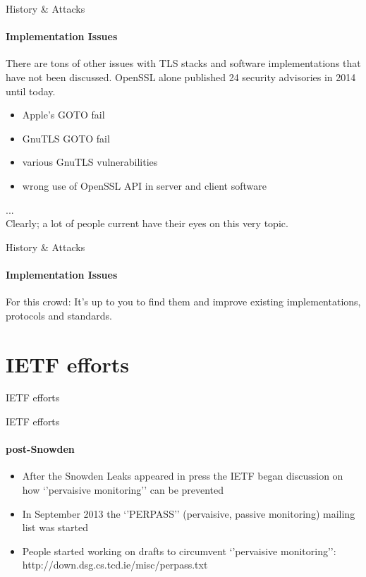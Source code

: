 \documentclass[hyperref={draft}]{beamer}
\begin{document}
\begin{frame}{History \& Attacks}
  \framesubtitle{Implementation Issues}
  There are tons of other issues with TLS stacks and software implementations that have not been discussed.
  \newline
  \newline
  OpenSSL alone published 24 security advisories in 2014 until today.

  \begin{itemize}
    \item Apple's GOTO fail
    \item GnuTLS GOTO fail
    \item various GnuTLS vulnerabilities
    \item wrong use of OpenSSL API in server and client software
  \end{itemize}
  ...\\
  Clearly; a lot of people current have their eyes on this very topic.
\end{frame}

\begin{frame}{History \& Attacks}
  \framesubtitle{Implementation Issues}
  For this crowd: It's up to you to find them and improve existing implementations, protocols and standards.
\end{frame}

\section{IETF efforts}

\begin{frame}{IETF efforts}
  \fontsize{10}{10}\selectfont{}
\end{frame}

\begin{frame}{IETF efforts}
  \framesubtitle{post-Snowden}
  \begin{itemize}
  \item After the Snowden Leaks appeared in press the IETF began discussion on how
`'pervaisive monitoring'' can be prevented
  \item In September 2013 the `'PERPASS'' (pervaisive, passive monitoring) mailing list was started
  \item People started working on drafts to circumvent `'pervaisive monitoring'': http://down.dsg.cs.tcd.ie/misc/perpass.txt
  \end{itemize}
\end{frame}
\end{document}
